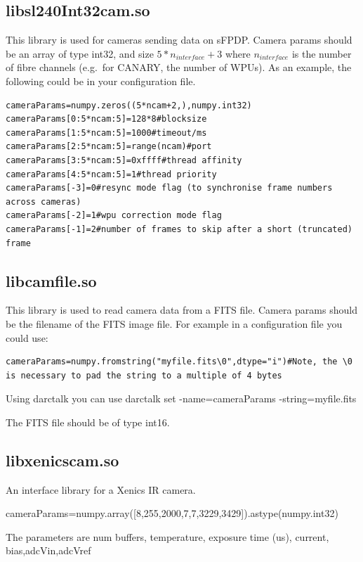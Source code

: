 \documentclass[a4,10pt]{article}
\begin{document}
\subsection{libsl240Int32cam.so}
This library is used for cameras sending data on sFPDP.  Camera params
should be an array of type int32, and size $5*n_{interface}+3$ where
$n_{interface}$ is the number of fibre channels (e.g.\ for CANARY, the
number of WPUs).  As an example, the following could be in your
configuration file.
\begin{verbatim}
cameraParams=numpy.zeros((5*ncam+2,),numpy.int32)
cameraParams[0:5*ncam:5]=128*8#blocksize
cameraParams[1:5*ncam:5]=1000#timeout/ms
cameraParams[2:5*ncam:5]=range(ncam)#port
cameraParams[3:5*ncam:5]=0xffff#thread affinity
cameraParams[4:5*ncam:5]=1#thread priority
cameraParams[-3]=0#resync mode flag (to synchronise frame numbers across cameras)
cameraParams[-2]=1#wpu correction mode flag
cameraParams[-1]=2#number of frames to skip after a short (truncated) frame
\end{verbatim}

\subsection{libcamfile.so}
This library is used to read camera data from a FITS file.
Camera params should be the filename of the FITS image file.
For example in a configuration file you could use:
\begin{verbatim}
cameraParams=numpy.fromstring("myfile.fits\0",dtype="i")#Note, the \0 is necessary to pad the string to a multiple of 4 bytes
\end{verbatim}
Using darctalk you can use darctalk set -name=cameraParams -string=myfile.fits

The FITS file should be of type int16.

\subsection{libxenicscam.so}
An interface library for a Xenics IR camera.

cameraParams=numpy.array([8,255,2000,7,7,3229,3429]).astype(numpy.int32)

The parameters are num buffers, temperature, exposure time (us), current, bias,adcVin,adcVref
\end{document}
